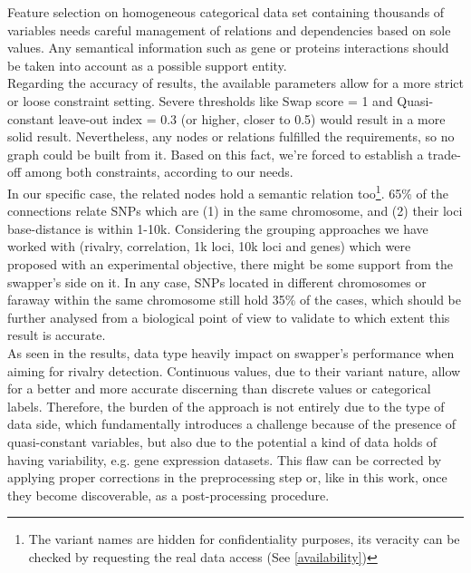 Feature selection on homogeneous categorical data set containing thousands of variables needs careful management of relations and dependencies based on sole values. Any semantical information such as gene or proteins interactions should be taken into account as a possible support entity.
\\

Regarding the accuracy of results, the available parameters allow for a more strict or loose constraint setting. Severe thresholds like Swap score = 1 and Quasi-constant leave-out index = 0.3 (or higher, closer to 0.5) would result in a more solid result. Nevertheless, any nodes or relations fulfilled the requirements, so no graph could be built from it. Based on this fact, we're forced to establish a trade-off among both constraints, according to our needs.
\\

In our specific case, the related nodes hold a semantic relation too\footnote{The variant names are hidden for confidentiality purposes, its veracity can be checked by requesting the real data access (See \ref{availability})}. 65\% of the connections relate SNPs which are (1) in the same chromosome, and (2) their loci base-distance is within 1-10k. Considering the grouping approaches we have worked with (rivalry, correlation, 1k loci, 10k loci and genes) which were proposed with an experimental objective, there might be some support from the swapper's side on it. In any case, SNPs located in different chromosomes or faraway within the same chromosome still hold 35\% of the cases, which should be further analysed from a biological point of view to validate to which extent this result is accurate.
\\

As seen in the results, data type heavily impact on swapper's performance when aiming for rivalry detection. Continuous values, due to their variant nature, allow for a better and more accurate discerning than discrete values or categorical labels. Therefore, the burden of the approach is not entirely due to the type of data side, which fundamentally introduces a challenge because of the presence of quasi-constant variables, but also due to the potential a kind of data holds of having variability, e.g. gene expression datasets.
This flaw can be corrected by applying proper corrections in the preprocessing step or, like in this work, once they become discoverable, as a post-processing procedure.
